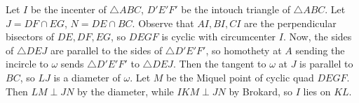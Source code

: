Let $I$ be the incenter of $\triangle{ABC}$, $D'E'F'$ be the intouch triangle of $\triangle{ABC}$. Let $J=DF\cap EG$, $N=DE\cap BC$. Observe that $AI,BI,CI$ are the perpendicular bisectors of $DE,DF,EG$, so $DEGF$ is cyclic with circumcenter $I$. Now, the sides of $\triangle{DEJ}$ are parallel to the sides of $\triangle{D'E'F'}$, so homothety at $A$ sending the incircle to $\omega$ sends $\triangle{D'E'F'}$ to $\triangle{DEJ}$. Then the tangent to $\omega$ at $J$ is parallel to $BC$, so $LJ$ is a diameter of $\omega$. Let $M$ be the Miquel point of cyclic quad $DEGF$. Then $LM\perp JN$ by the diameter, while $IKM\perp JN$ by Brokard, so $I$ lies on $KL$.